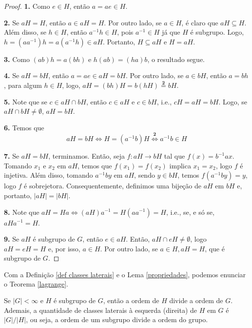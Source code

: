 	\begin{proof}
		\textbf{1.} Como $e\in H$, então $a = ae \in H$.
		\par\vspace{0.4cm}
		\textbf{2.} Se $aH = H$, então $a\in aH = H$. Por outro lado, se $a\in H$, é claro que $aH\subseteq H$. Além disso, se $h\in H$, então $a^{-1}h\in H$, pois $a^{-1}\in H$ já que $H$ é subgrupo. Logo, $h = (aa^{-1})h = a(a^{-1}h)\in aH$. Portanto, $H\subseteq aH$ e $H = aH$. 
		\par\vspace{0.4cm}
		\textbf{3.} Como $(ab)h = a(bh)$ e $h(ab) = (ha)b$, o resultado segue.
		\par\vspace{0.4cm}
		\textbf{4.} Se $aH = bH$, então $a = ae\in aH = bH$. Por outro lado, se $a\in bH$, então $a = bh$, para algum $h\in H$, logo, $aH = (bh)H = b(hH) \overset{\textbf{2}}{=} bH$.
		\par\vspace{0.4cm}
		\textbf{5.} Note que se $c\in aH\cap bH$, então $c\in aH$ e $c\in bH$, i.e., $cH = aH = bH$. Logo, se $aH\cap bH\neq\emptyset$, $aH = bH$.
		\par\vspace{0.4cm}
		\textbf{6.} Temos que
		\begin{equation*}
		aH = bH \Leftrightarrow H = (a^{-1}b)H \overset{\textbf{2}}{\Leftrightarrow} a^{-1}b \in H
		\end{equation*}
		\par\vspace{0.4cm}
		\textbf{7.} Se $aH = bH$, terminamos. Então, seja $f: aH\to bH$ tal que $f(x) = b^{-1}ax$. Tomando $x_1$ e $x_2$ em $aH$, temos que $f(x_1) = f(x_2)$ implica $x_1=x_2$, logo $f$ é injetiva. Além disso, tomando $a^{-1}by$ em $aH$, sendo $y\in bH$, temos $f(a^{-1}by) = y$, logo $f$ é sobrejetora. Consequentemente, definimos uma bijeção de $aH$ em $bH$ e, portanto, $|aH| = |bH|$.
		\par\vspace{0.4cm}
		\textbf{8.} Note que $aH = Ha \Leftrightarrow (aH)a^{-1} = H(aa^{-1}) = H$, i.e., se, e só se, $aHa^{-1} = H$.
		\par\vspace{0.4cm}
		\textbf{9.} Se $aH$ é subgrupo de $G$, então $e\in aH$. Então, $aH\cap eH \neq \emptyset$, logo $aH = eH = H$ e, por isso, $a\in H$. Por outro lado, se $a\in H, aH = H$, que é subgrupo de $G$.	
		
	\end{proof}
	\par\vspace{0.3cm} Com a Definição \eqref{def classes laterais} e o Lema \eqref{propriedades}, podemos enunciar o Teorema \eqref{lagrange}.
	\begin{theorem}
		\label{lagrange}
		Se $|G|<\infty$ e $H$ é subgrupo de $G$, então a ordem de $H$ divide a ordem de $G$. Ademais, a quantidade de classes laterais à esquerda (direita) de $H$ em $G$ é $|G|/|H|$, ou seja, a ordem de um subgrupo divide a ordem do grupo. 
	\end{theorem}
	
